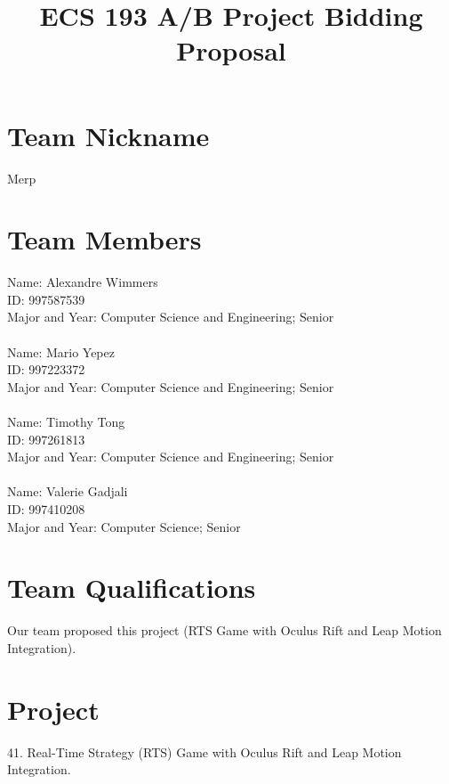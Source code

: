 \documentclass[11pt]{article}
\title{ECS 193 A/B Project Bidding Proposal}
\date{}
\begin{document}
	
\maketitle

\section*{Team Nickname}

Merp

\section*{Team Members}

Name: Alexandre Wimmers\\
ID: 997587539\\
Major and Year: Computer Science and Engineering; Senior\\
\\
Name: Mario Yepez\\
ID: 997223372\\
Major and Year: Computer Science and Engineering; Senior\\
\\
Name: Timothy Tong\\
ID: 997261813\\
Major and Year: Computer Science and Engineering; Senior\\
\\
Name: Valerie Gadjali\\
ID: 997410208\\
Major and Year: Computer Science; Senior

\section*{Team Qualifications}

Our team proposed this project (RTS Game with Oculus Rift and Leap Motion Integration).

\pagebreak

\section*{Project}

41. Real-Time Strategy (RTS) Game with Oculus Rift and Leap Motion Integration.
\end{document}

